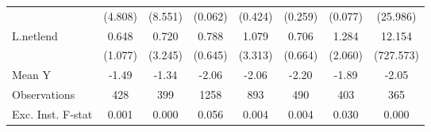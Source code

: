 {\begin{tabular}{l*{7}{c}}
            &     (4.808)         &     (8.551)         &     (0.062)         &     (0.424)         &     (0.259)         &     (0.077)         &    (25.986)         \\
\addlinespace
L.netlend   &       0.648         &       0.720         &       0.788         &       1.079         &       0.706         &       1.284         &      12.154         \\
            &     (1.077)         &     (3.245)         &     (0.645)         &     (3.313)         &     (0.664)         &     (2.060)         &   (727.573)         \\
\midrule
Mean Y      &       -1.49         &       -1.34         &       -2.06         &       -2.06         &       -2.20         &       -1.89         &       -2.05         \\
Observations&         428         &         399         &        1258         &         893         &         490         &         403         &         365         \\
Exc. Inst. F-stat&       0.001         &       0.000         &       0.056         &       0.004         &       0.004         &       0.030         &       0.000         \\
\bottomrule
\end{tabular}
}
